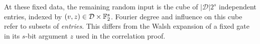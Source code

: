 At these fixed data, the remaining random input is the cube of
$|\mathcal D|2^s$ independent entries, indexed by
$(v,z)\in\mathcal D\times\mathbb F_2^s$. Fourier degree and influence on this
cube refer to subsets of \emph{entries}. This differs from the Walsh
expansion of a fixed gate in its $s$-bit argument $z$ used in the
correlation proof.
